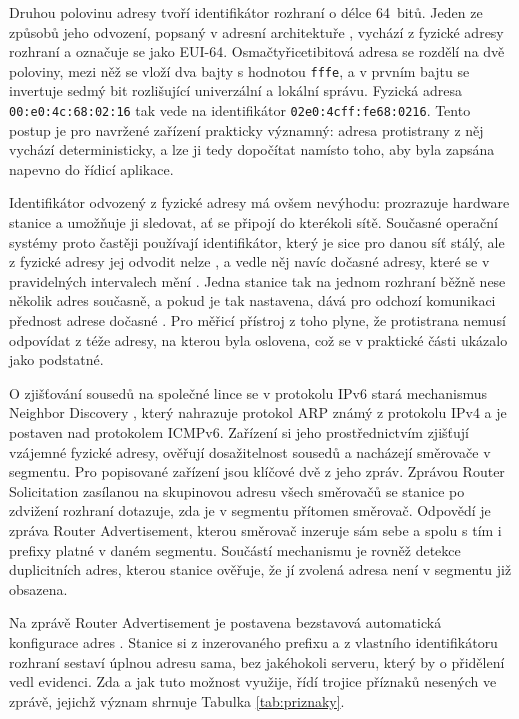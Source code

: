 Druhou polovinu adresy tvoří identifikátor rozhraní o délce 64~bitů. Jeden ze způsobů jeho odvození, popsaný v adresní architektuře \cite{rfc4291}, vychází z fyzické adresy rozhraní a označuje se jako EUI-64. Osmačtyřicetibitová adresa se rozdělí na dvě poloviny, mezi něž se vloží dva bajty s hodnotou \texttt{fffe}, a v prvním bajtu se invertuje sedmý bit rozlišující univerzální a lokální správu. Fyzická adresa \texttt{00:e0:4c:68:02:16} tak vede na identifikátor \texttt{02e0:4cff:fe68:0216}. Tento postup je pro navržené zařízení prakticky významný: adresa protistrany z něj vychází deterministicky, a lze ji tedy dopočítat namísto toho, aby byla zapsána napevno do řídicí aplikace.

Identifikátor odvozený z fyzické adresy má ovšem nevýhodu: prozrazuje hardware stanice a umožňuje ji sledovat, ať se připojí do kterékoli sítě. Současné operační systémy proto častěji používají identifikátor, který je sice pro danou síť stálý, ale z fyzické adresy jej odvodit nelze \cite{rfc7217}, a vedle něj navíc dočasné adresy, které se v pravidelných intervalech mění \cite{rfc8981}. Jedna stanice tak na jednom rozhraní běžně nese několik adres současně, a pokud je tak nastavena, dává pro odchozí komunikaci přednost adrese dočasné \cite{rfc8981}. Pro měřicí přístroj z toho plyne, že protistrana nemusí odpovídat z téže adresy, na kterou byla oslovena, což se v praktické části ukázalo jako podstatné.

O zjišťování sousedů na společné lince se v protokolu IPv6 stará mechanismus Neighbor Discovery \cite{rfc4861}, který nahrazuje protokol ARP známý z protokolu IPv4 a je postaven nad protokolem ICMPv6. Zařízení si jeho prostřednictvím zjišťují vzájemné fyzické adresy, ověřují dosažitelnost sousedů a nacházejí směrovače v segmentu. Pro popisované zařízení jsou klíčové dvě z jeho zpráv. Zprávou Router Solicitation zasílanou na skupinovou adresu všech směrovačů se stanice po zdvižení rozhraní dotazuje, zda je v segmentu přítomen směrovač. Odpovědí je zpráva Router Advertisement, kterou směrovač inzeruje sám sebe a spolu s tím i prefixy platné v daném segmentu. Součástí mechanismu je rovněž detekce duplicitních adres, kterou stanice ověřuje, že jí zvolená adresa není v segmentu již obsazena.

Na zprávě Router Advertisement je postavena bezstavová automatická konfigurace adres \cite{rfc4862}. Stanice si z inzerovaného prefixu a z vlastního identifikátoru rozhraní sestaví úplnou adresu sama, bez jakéhokoli serveru, který by o přidělení vedl evidenci. Zda a jak tuto možnost využije, řídí trojice příznaků nesených ve zprávě, jejichž význam shrnuje Tabulka \ref{tab:priznaky}.


